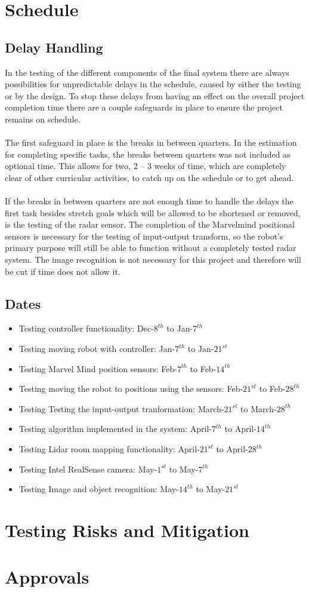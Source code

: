 \documentclass[english,12pt]{article}
\begin{document}
\section{Schedule}
\subsection{Delay Handling}
In the testing of the different components of the final system there are always possibilities 
for unpredictable delays in the schedule, caused by either the testing or by the design. 
To stop these delays from having an effect on the overall project completion time there are a 
couple safeguards in place to ensure the project remains on schedule.\\\\
The first safeguard in place is the breaks in between quarters. In the estimation for 
completing specific tasks, the breaks between quarters was not included as optional time. 
This allows for two, 2 – 3 weeks of time, which are completely clear of other curricular 
activities, to catch up on the schedule or to get ahead.\\\\
If the breaks in between quarters are not enough time to handle the delays the first task 
besides stretch goals which will be allowed to be shortened or removed, is the testing of 
the radar sensor. The completion of the Marvelmind positional sensors is necessary for the 
testing of input-output transform, so the robot’s primary purpose will still be able to 
function without a completely tested radar system. The image recognition is not necessary for this project 
and therefore will be cut if time does not allow it.
\subsection{Dates}
\begin{itemize}
    \item[] Testing controller functionality: Dec-$8^{th}$ to Jan-$7^{th}$
    \item[] Testing moving robot with controller: Jan-$7^{th}$ to Jan-$21^{st}$
    \item[] Testing Marvel Mind position sensors: Feb-$7^{th}$ to Feb-$14^{th}$
    \item[] Testing moving the robot to positions using the sensors: Feb-$21^{st}$ to Feb-$28^{th}$
    \item[] Testing Testing the input-output tranformation: March-$21^{st}$ to March-$28^{th}$
    \item[] Testing algorithm implemented in the system: April-$7^{th}$ to April-$14^{th}$
    \item[] Testing Lidar room mapping functionality: April-$21^{st}$ to April-$28^{th}$
    \item[] Testing Intel RealSense camera: May-$1^{st}$ to May-$7^{th}$
    \item[] Testing Image and object recognition: May-$14^{th}$ to May-$21^{st}$ 
\end{itemize}
\section{Testing Risks and Mitigation}

\section{Approvals}
\end{document}
